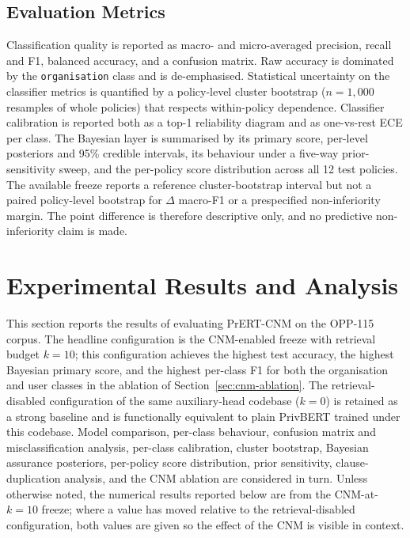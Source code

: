 \documentclass[final,3p,times,twocolumn]{elsarticle}
\begin{document}
	\subsection{Evaluation Metrics}
	Classification quality is reported as macro- and micro-averaged precision, recall
	and F1, balanced accuracy, and a confusion matrix. Raw accuracy is dominated
	by the \texttt{organisation} class and is de-emphasised. Statistical
	uncertainty on the classifier metrics is quantified by a policy-level cluster
	bootstrap ($n = 1{,}000$ resamples of whole policies) that respects within-policy
	dependence. Classifier calibration is reported both as a top-1 reliability diagram
	and as one-vs-rest ECE per class. The Bayesian layer is summarised by its
	primary score, per-level posteriors and 95\% credible intervals, its behaviour
	under a five-way prior-sensitivity sweep, and the per-policy score
	distribution across all 12 test policies.
	The available freeze reports a reference cluster-bootstrap interval but not a
	paired policy-level bootstrap for $\Delta$ macro-F1 or a prespecified
	non-inferiority margin. The point difference is therefore descriptive only,
	and no predictive non-inferiority claim is made.
	\section{Experimental Results and Analysis}
	\label{sec:results} This section reports the results of evaluating PrERT-CNM
	on the OPP-115 corpus. The headline configuration is the CNM-enabled freeze with
	retrieval budget $k = 10$; this configuration achieves the highest test
	accuracy, the highest Bayesian primary score, and the highest per-class F1 for
	both the organisation and user classes in the ablation of Section~\ref{sec:cnm-ablation}.
	The retrieval-disabled configuration of the same auxiliary-head codebase ($k =
	0$) is retained as a strong baseline and is functionally equivalent to plain PrivBERT
	trained under this codebase. Model comparison, per-class behaviour, confusion
	matrix and misclassification analysis, per-class calibration, cluster
	bootstrap, Bayesian assurance posteriors, per-policy score distribution, prior
	sensitivity, clause-duplication analysis, and the CNM ablation are considered in
	turn. Unless otherwise noted, the numerical results reported below are from the
	CNM-at-$k=10$ freeze; where a value has moved relative to the retrieval-disabled
	configuration, both values are given so the effect of the CNM is visible in context.
	
\end{document}
